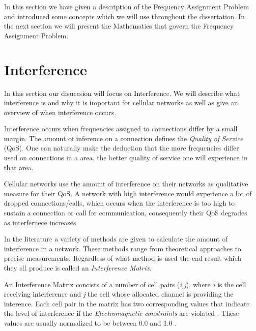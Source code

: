 In this section we have given a description of the Frequency Assignment Problem and introduced some concepts which we will use throughout the dissertation. In the next section we will present the 
Mathematics that govern the Frequency Assignment Problem.
\section{Interference}
\label{sec:Interference}
In this section our disuccsion will focus on Interference. We will describe what interference is and why it is important for cellular networks as well as give an overview of when interference occurs.

Interference occurs when frequencies assigned to connections differ by a small margin. The amount of inference on a connection defines the \emph{Quality of Service} (QoS). One can naturally make the deduction that the more frequencies differ used on connections in a area, the better quality of service one will experience in that area. 

Cellular networks use the amount of interference on their networks as qualitative measure for their QoS. A network with high interference would experience a lot of dropped connections/calls, which occurs when the interference is too high to sustain a connection or call for communication, consequently their QoS degrades as interfernece increases.

In the literature a variety of methods are given to calculate the amount of interference in a network. These methods range from theoretical approaches to precise measurements. Regardless of what method is used the end result which they all produce is called an \emph{Interference Matrix}\cite{ACOvsEA}.

An Interference Matrix concists of a number of cell pairs (\emph{i,j}), where \emph{i} is the cell receiving interference and \emph{j} the cell whose allocated channel is providing the interence. Each cell pair in the matrix has two corresponding values that indicate the level of interference if the \emph{Electromagnetic constraints} are violated \cite{Eisenblatter,Karen2004,ACOvsEA}. These values are usually normalized to be between 0.0 and 1.0 \cite{AndreasPaper}.

